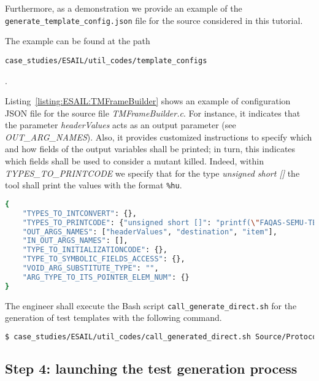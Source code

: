 Furthermore, as a demonstration we provide an example of the \texttt{generate\_template\_config.json} file for the source considered in this tutorial. 

The example can be found at the path \begin{small}\texttt{case\_studies/ESAIL/util\_codes/template\_configs}\end{small}.

Listing~\ref{listing:ESAIL:TMFrameBuilder} shows an example of configuration JSON file for the source file \emph{TMFrameBuilder.c}. For instance, it indicates that the parameter \emph{headerValues} acts as an output parameter (see \emph{OUT\_ARG\_NAMES}). Also, it provides customized instructions to specify which and how fields of the output variables shall be printed; in turn, this indicates which fields shall be used to consider a mutant killed. Indeed, within \emph{TYPES\_TO\_PRINTCODE} we specify that for the type \emph{unsigned short []} the tool shall print the values with the format \texttt{\%hu}.

\begin{lstlisting}[language=bash,label=listing:ESAIL:TMFrameBuilder,caption=JSON configuration file for TMFrameBuilder.c.]
{
    "TYPES_TO_INTCONVERT": {},
    "TYPES_TO_PRINTCODE": {"unsigned short []": "printf(\"FAQAS-SEMU-TEST_OUTPUT: headerValues = %hu\\n\", {});", "unsigned char []": "printf(\"FAQAS-SEMU-TEST_OUTPUT: destination = %hc\\n\", {});", "struct TmByteField_s": "printf(\"FAQAS-SEMU-TEST_OUTPUT: item.size = %u, item.data = %s\\n\", {}.size, {}.data);"},
    "OUT_ARGS_NAMES": ["headerValues", "destination", "item"],
    "IN_OUT_ARGS_NAMES": [],
    "TYPE_TO_INITIALIZATIONCODE": {},
    "TYPE_TO_SYMBOLIC_FIELDS_ACCESS": {},
    "VOID_ARG_SUBSTITUTE_TYPE": "",
    "ARG_TYPE_TO_ITS_POINTER_ELEM_NUM": {}
}
\end{lstlisting}

The engineer shall execute the Bash script \texttt{call\_generate\_direct.sh} for the generation of test templates with the following command.

\begin{lstlisting}[language=bash]
$ case_studies/ESAIL/util_codes/call_generated_direct.sh Source/ProtocolLayer/TMFrameBuilder/Source/TMFrameBuilder.c
\end{lstlisting}

\subsection{Step 4: launching the test generation process}

